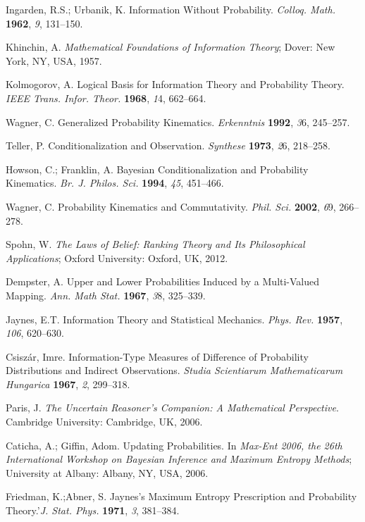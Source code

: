 \documentclass[entropy,article,accept,oneauthor,pdftex,12pt,a4paper]{mdpi}
\begin{document}
\begin{thebibliography}{----}
 Ingarden, R.S.; Urbanik, K.  Information Without Probability. \emph{Colloq. Math.} {\bf1962}, {\emph9}, 131--150.

 Khinchin, A. \emph{Mathematical Foundations of Information Theory}; Dover: New York, NY, USA, 1957.

 Kolmogorov, A. Logical Basis for Information Theory and Probability Theory. \emph{IEEE Trans.  Infor. Theor.} {\bf1968}, {\emph 14},  662--664.

 Wagner, C. Generalized Probability Kinematics. \emph{Erkenntnis} {\bf1992}, {\emph36}, 245--257.

 Teller, P. Conditionalization and Observation. \emph{Synthese} {\bf1973}, {\emph26}, 218--258.

 Howson, C.; Franklin, A. Bayesian Conditionalization and Probability Kinematics. \emph{Br. J. Philos. Sci.} {\bf1994}, \emph{45},  451--466.

Wagner, C. Probability Kinematics and Commutativity. \emph{Phil. Sci.}  {\bf2002}, {\emph69}, 266--278.

 Spohn, W. \emph{The Laws of Belief: Ranking Theory and Its Philosophical Applications}; Oxford University: Oxford, UK, 2012.

 Dempster, A. Upper and Lower Probabilities Induced by a Multi-Valued Mapping. \emph{Ann. Math Stat.} {\bf1967}, {\emph38}, 325--339.

 Jaynes, E.T. Information Theory and Statistical Mechanics. \emph{Phys. Rev.} {\bf1957}, \emph{106}, 620--630.

 Csisz{\'a}r, Imre. Information-Type Measures of Difference of Probability Distributions and Indirect Observations. \emph{Studia Scientiarum Mathematicarum Hungarica} {\bf 1967}, {\emph 2}, 299--318.

 Paris, J. \emph{The Uncertain Reasoner's Companion: A Mathematical Perspective}.  Cambridge University: Cambridge, UK, 2006.

 Caticha, A.; Giffin, Adom. Updating Probabilities. In \emph{Max-Ent 2006, the 26th International Workshop on Bayesian Inference and Maximum Entropy Methods}; University at Albany: Albany, NY, USA, 2006.

Friedman, K.;Abner, S. Jaynes's Maximum Entropy Prescription and Probability Theory.'\emph{J. Stat. Phys.} {\bf1971}, {\emph3}, 381--384.


\end{thebibliography}
\end{document}

